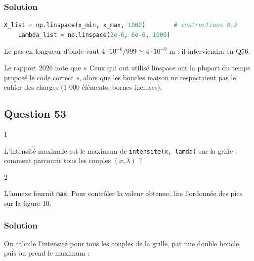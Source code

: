 \documentclass[11pt,a4paper]{article}
\begin{document}
\hypertarget{solution-51}{%
\subsubsection{Solution}\label{solution-51}}

\begin{lstlisting}[language=Python]
    X_list = np.linspace(x_min, x_max, 1000)        # instructions 8.2
    Lambda_list = np.linspace(2e-6, 6e-6, 1000)
\end{lstlisting}

Le pas en longueur d'onde vaut \(4\cdot10^{-6}/999\simeq4\cdot10^{-9}\) m : il interviendra en Q56.

\begin{jury}

Le rapport 2026 note que « Ceux qui ont utilisé linspace ont la plupart du temps proposé le code correct », alors que les boucles maison ne respectaient pas le cahier des charges (1 000 éléments, bornes incluses).

\end{jury}

\hypertarget{question-53}{%
\subsection{Question 53}\label{question-53}}

\begin{indication}{1}

L'intensité maximale est le maximum de \texttt{intensite(\allowbreak{}x,\allowbreak{}\ lamda)\allowbreak{}} sur la grille : comment parcourir tous les couples \((x,\lambda)\) ?

\end{indication}

\begin{indication}{2}

L'annexe fournit \texttt{max}. Pour contrôler la valeur obtenue, lire l'ordonnée des pics sur la figure 10.

\end{indication}

\hypertarget{solution-52}{%
\subsubsection{Solution}\label{solution-52}}

On calcule l'intensité pour tous les couples de la grille, par une double boucle, puis on prend le maximum :
\end{document}

